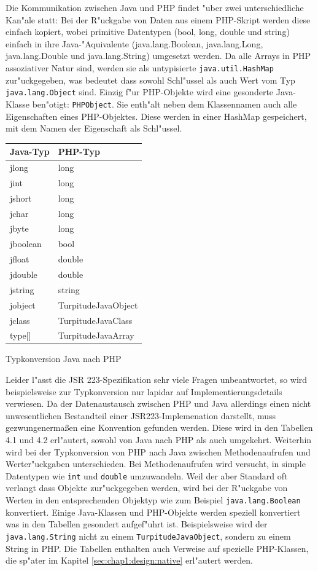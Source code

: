 Die Kommunikation zwischen Java und PHP findet "uber zwei unterschiedliche Kan"ale statt:
Bei der R"uckgabe von Daten aus einem PHP-Skript werden diese einfach kopiert, wobei primitive Datentypen (bool, long, double und string)
einfach in ihre Java-"Aquivalente (java.lang.Boolean, java.lang.Long, java.lang.Double und java.lang.String) umgesetzt werden.
Da alle Arrays in PHP assoziativer Natur sind, werden sie als untypisierte \texttt{java.util.HashMap} zur"uckgegeben, was bedeutet dass sowohl 
Schl"ussel als auch Wert vom Typ \texttt{java.lang.Object} sind. Einzig f"ur PHP-Objekte wird eine gesonderte Java-Klasse ben"otigt: \texttt{PHPObject}.
Sie enth"alt neben dem Klassennamen auch alle Eigenschaften eines PHP-Objektes. 
Diese werden in einer HashMap gespeichert, mit dem Namen der Eigenschaft als Schl"ussel.
\begin{floatingtable}{
\begin{tabular}{|l|l|}
\hline
Java-Typ & PHP-Typ\\
\hline\hline
jlong & long\\
jint & long\\
jshort & long\\
jchar & long\\
jbyte & long\\
jboolean & bool\\
jfloat & double\\
jdouble & double\\
jstring & string\\
jobject & TurpitudeJavaObject\\
jclass & TurpitudeJavaClass\\
type[] & TurpitudeJavaArray\\
\hline
\end{tabular}}
\caption{Typkonversion Java nach PHP}
\end{floatingtable}
Leider l"asst die JSR 223-Spezifikation sehr viele Fragen unbeantwortet, so wird beispielsweise zur Typkonversion nur lapidar auf 
Implementierungsdetails verwiesen. Da der Datenaustausch zwischen PHP und Java allerdings einen nicht unwesentlichen Bestandteil
einer JSR223-Implemenation darstellt, muss gezwungenerma\ss en eine Konvention gefunden werden. Diese wird in den Tabellen 4.1 und 4.2
erl"autert, sowohl von Java nach PHP als auch umgekehrt. Weiterhin wird bei der Typkonversion von PHP nach Java zwischen 
Methodenaufrufen und Werter"uckgaben unterschieden. Bei Methodenaufrufen wird versucht, in simple Datentypen wie \texttt{int} und \texttt{double}
umzuwandeln. Weil der aber Standard oft verlangt dass Objekte zur"uckgegeben werden, wird bei der R"uckgabe von Werten in den entsprechenden
Objektyp wie zum Beispiel \texttt{java.lang.Boolean} konvertiert. Einige Java-Klassen und PHP-Objekte werden speziell konvertiert was
in den Tabellen gesondert aufgef"uhrt ist. Beispielsweise wird der
\texttt{java.lang.String} nicht zu einem \texttt{TurpitudeJavaObject}, sondern zu einem String in PHP. Die
Tabellen enthalten auch Verweise auf spezielle PHP-Klassen, die sp"ater im Kapitel \ref{sec:chap1:design:native} erl"autert werden.


